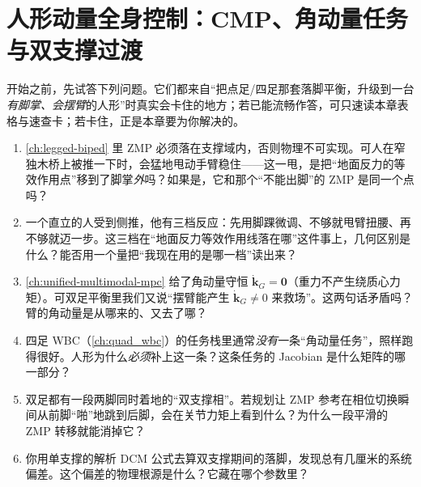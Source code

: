 \chapter{人形动量全身控制：CMP、角动量任务与双支撑过渡}
\label{ch:humanoid-momentum-wbc}


\begin{practice}[前置自测]
开始之前，先试答下列问题。它们都来自“把点足/四足那套落脚平衡，升级到一台\emph{有脚掌、会摆臂}的人形”时真实会卡住的地方；若已能流畅作答，可只速读本章表格与速查卡；若卡住，正是本章要为你解决的。
\begin{enumerate}
  \item \cref{ch:legged-biped} 里 ZMP 必须落在支撑域内，否则物理不可实现。可人在窄独木桥上被推一下时，会猛地甩动手臂稳住——这一甩，是把“地面反力的等效作用点”移到了脚掌\emph{外}吗？如果是，它和那个“不能出脚”的 ZMP 是同一个点吗？
  \item 一个直立的人受到侧推，他有三档反应：先用脚踝微调、不够就甩臂扭腰、再不够就迈一步。这三档在“地面反力等效作用线落在哪”这件事上，几何区别是什么？能否用一个量把“我现在用的是哪一档”读出来？
  \item \cref{ch:unified-multimodal-mpc} 给了角动量守恒 $\dot{\mathbf k}_G=\mathbf 0$（重力不产生绕质心力矩）。可双足平衡里我们又说“摆臂能产生 $\dot{\mathbf k}_G\ne 0$ 来救场”。这两句话矛盾吗？臂的角动量是从哪来的、又去了哪？
  \item 四足 WBC（\cref{ch:quad_wbc}）的任务栈里通常\emph{没有}一条“角动量任务”，照样跑得很好。人形为什么\emph{必须}补上这一条？这条任务的 Jacobian 是什么矩阵的哪一部分？
  \item 双足都有一段两脚同时着地的“双支撑相”。若规划让 ZMP 参考在相位切换瞬间从前脚“啪”地跳到后脚，会在关节力矩上看到什么？为什么一段平滑的 ZMP 转移就能消掉它？
  \item 你用单支撑的解析 DCM 公式去算双支撑期间的落脚，发现总有几厘米的系统偏差。这个偏差的物理根源是什么？它藏在哪个参数里？
\end{enumerate}
\end{practice}

